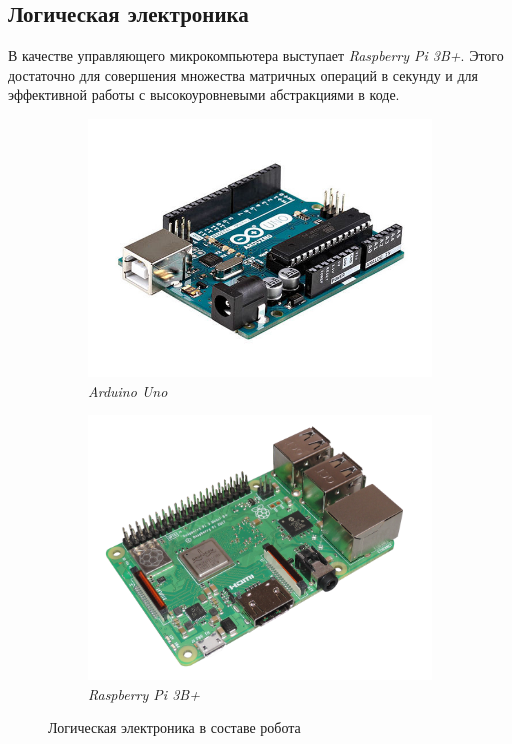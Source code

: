\subsection{Логическая электроника}
В качестве управляющего микрокомпьютера выступает \textit{Raspberry Pi 3B+}. Этого достаточно для совершения множества матричных операций в секунду и для эффективной работы с высокоуровневыми абстракциями в коде.

\begin{figure}[ht]
    \centering
    \begin{subfigure}[b]{0.45\textwidth}    
        \centering
        \includegraphics[scale=0.35]{chapter_mechanics_construction/figure3.jpg}
        \caption{\textit{Arduino Uno}}
    \end{subfigure}
    \begin{subfigure}[b]{0.45\textwidth}
        \centering
        \includegraphics[scale=0.2]{chapter_mechanics_construction/figure3.png}
        \caption{\textit{Raspberry Pi 3B+}}
    \end{subfigure}
     
    \caption{Логическая электроника в составе робота}
    \label{fig:leg_model}
\end{figure}

